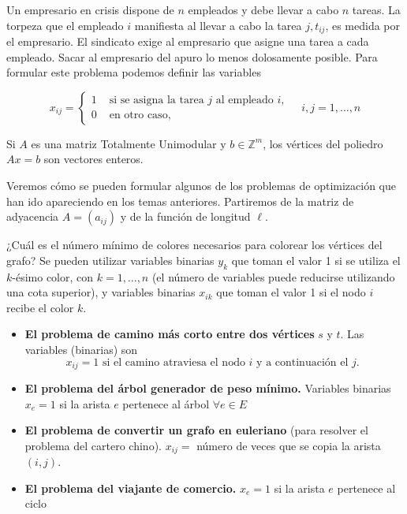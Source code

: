 \documentclass[openany]{book}
\begin{document}
\begin{example}
  Un empresario en crisis dispone de $n$ empleados y debe llevar a cabo $n$ tareas. La torpeza que el empleado $i$ manifiesta al llevar a cabo la tarea $j, t_{i j}$, es medida por el empresario. El sindicato exige al empresario que asigne una tarea a cada empleado. Sacar al empresario del apuro lo menos dolosamente posible. Para formular este problema podemos definir las variables

  $$
  x_{i j}=\left\{\begin{array}{ll}
  1 & \text { si se asigna la tarea } j \text { al empleado } i, \\
  0 & \text { en otro caso, }
  \end{array} \quad i, j=1, \ldots, n\right.
  $$

\end{example}

\begin{proposition}
  Si $A$ es una matriz Totalmente Unimodular y $b \in \mathbb{Z}^{m}$, los vértices del poliedro $A x=b$ son vectores enteros.
\end{proposition}


Veremos cómo se pueden formular algunos de los problemas de optimización que han ido apareciendo en los temas anteriores. Partiremos de la matriz de adyacencia $A=\left(a_{i j}\right)$ y de la función de longitud $\ell$.

¿Cuál es el número mínimo de colores necesarios para colorear los vértices del grafo? Se pueden utilizar variables binarias $y_{k}$ que toman el valor 1 si se utiliza el $k$-ésimo color, con $k=1, \ldots, n$ (el número de variables puede reducirse utilizando una cota superior), y variables binarias $x_{i k}$ que toman el valor 1 si el nodo $i$ recibe el color $k$.

\begin{itemize}
  \item \textbf{El problema de camino más corto entre dos vértices} $s$ y $t$. Las variables (binarias) son
  $$
  x_{i j}=1 \text { si el camino atraviesa el nodo } i \text { y a continuación el } j \text {. }
  $$

  \item \textbf{El problema del árbol generador de peso mínimo.} Variables binarias $x_{e}=1$ si la arista $e$ pertenece al árbol $\forall e \in E$

  \item \textbf{El problema de convertir un grafo en euleriano} (para resolver el problema del cartero chino). $x_{i j}=$ número de veces que se copia la arista $(i, j)$.

  \item \textbf{El problema del viajante de comercio.} $x_{e}=1$ si la arista $e$ pertenece al ciclo
\end{itemize}
\end{document}
